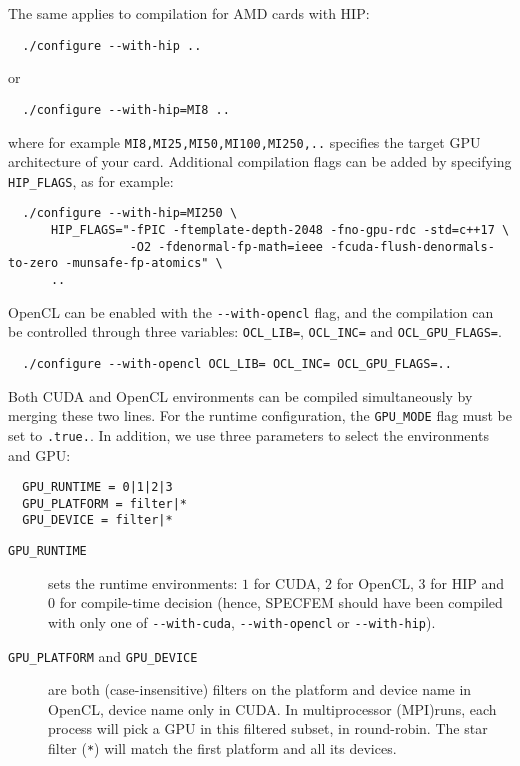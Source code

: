 \noindent
The same applies to compilation for AMD cards with HIP:
{\small
\begin{verbatim}
  ./configure --with-hip ..
\end{verbatim}
}
or
{\small
\begin{verbatim}
  ./configure --with-hip=MI8 ..
\end{verbatim}
}
\noindent
where for example \texttt{MI8,MI25,MI50,MI100,MI250,..} specifies the target GPU architecture of your card.
Additional compilation flags can be added by specifying \texttt{HIP\_FLAGS}, as for example:
{\small
\begin{verbatim}
  ./configure --with-hip=MI250 \
      HIP_FLAGS="-fPIC -ftemplate-depth-2048 -fno-gpu-rdc -std=c++17 \
                 -O2 -fdenormal-fp-math=ieee -fcuda-flush-denormals-to-zero -munsafe-fp-atomics" \
      ..
\end{verbatim}
}


OpenCL can be enabled with the \texttt{-{}-with-opencl} flag, and the
compilation can be controlled through three variables: \texttt{OCL\_LIB=},
\texttt{OCL\_INC=} and \texttt{OCL\_GPU\_FLAGS=}.
{\small
\begin{verbatim}
  ./configure --with-opencl OCL_LIB= OCL_INC= OCL_GPU_FLAGS=..
\end{verbatim}
}


Both CUDA and OpenCL environments can be compiled simultaneously by merging these two lines.
For the runtime configuration, the \texttt{GPU\_MODE} flag must be set
to \texttt{.true.}. In addition, we use three parameters to select the
environments and GPU:
{\small
\begin{verbatim}
  GPU_RUNTIME = 0|1|2|3
  GPU_PLATFORM = filter|*
  GPU_DEVICE = filter|*
\end{verbatim}
}

\begin{description}
\item[\texttt{GPU\_RUNTIME}] sets the runtime environments: $1$ for CUDA, $2$ for OpenCL, $3$ for HIP
 and $0$ for compile-time decision (hence, SPECFEM should
have been compiled with only one of \texttt{-{}-with-cuda}, \texttt{-{}-with-opencl} or \texttt{-{}-with-hip}).

\item[\texttt{GPU\_PLATFORM} and \texttt{GPU\_DEVICE}] are both (case-insensitive)
filters on the platform and device name in OpenCL, device name only in
CUDA. In multiprocessor (MPI)runs, each process will pick a GPU in
this filtered subset, in round-robin. The star filter (\texttt{*})
will match the first platform and all its devices.
\end{description}

